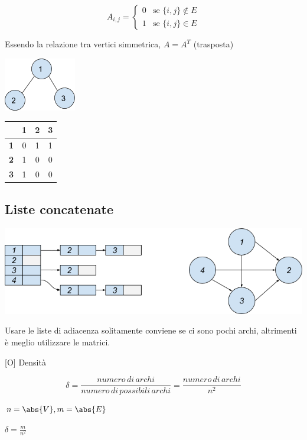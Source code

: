 \documentclass[11pt,a4paper,twoside,openright]{book}
\begin{document}
\begin{equation}
A_{i,j} = 
\begin{cases}
0 & \mbox{se } \{i,j\} \notin E \\ 
1 & \mbox{se } \{i,j\} \in E
\end{cases}
\end{equation}

{Essendo la relazione tra vertici simmetrica, $A=A^T$ (trasposta)}

{\includegraphics{images/image535.png}}

\begin{tabular}{|c|c|c|c|}
\hline 
  & \textbf{1} & \textbf{2} & \textbf{3} \\ 
\hline 
\textbf{1} & 0 & 1 & 1 \\ 
\hline 
\textbf{2} & 1 & 0 & 0 \\ 
\hline 
\textbf{3} & 1 & 0 & 0 \\ 
\hline 
\end{tabular} 

\subsection{Liste concatenate}

{\includegraphics{images/image537.png}}

{Usare le liste di adiacenza solitamente conviene se ci sono pochi archi, altrimenti è meglio utilizzare le matrici.}

{{[}O{]} Densità}

\begin{equation}
\delta=\frac{numero\,di\,archi}{numero\,di\,possibili\,archi} = \frac{numero\,di\,archi}{n^2}
\end{equation}

$n=\abs{V},m=\abs{E}$

$\delta=\frac{m}{n^2}$
\end{document}
